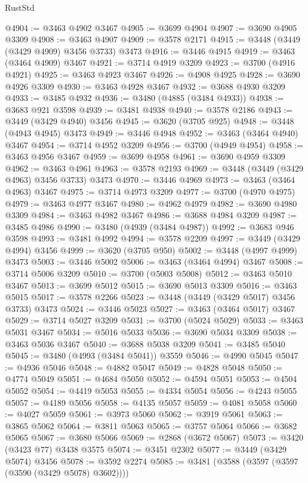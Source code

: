 \begin{lexlean}{RustStd}
\begin{coremodule}
{\begin{coremodule}
{{{{{{{{{{{{{{{{{{{{{{{{{{{{{{{{{{{{{{{{{{{{{{{{{{{{{{{{{{{{{{{{{{{{{{{{{{{{{{{{{{{{{@4904 := @3463 @4902 @3467
@4905 := @3699 @4904
@4907 := @3690 @4905 @3309
@4908 := @3463 @4907
@4909 := @3578 @2171
@4915 := @3448 (@3449 (@3429 @4909) @3456 @3733) @3473
@4916 := @3446 @4915
@4919 := @3463 (@3464 @4909) @3467
@4921 := @3714 @4919 @3209
@4923 := @3700 (@4916 @4921)
@4925 := @3463 @4923 @3467
@4926 := @4908 @4925
@4928 := @3690 @4926 @3309
@4930 := @3463 @4928 @3467
@4932 := @3688 @4930 @3209
@4933 := @3485 @4932
@4936 := @3480 (@4885 (@3484 @4933))
@4938 := @3683 @921 @3598
@4939 := @3481 @4938
@4940 := @3578 @2186
@4943 := @3449 (@3429 @4940) @3456
@4945 := @3620 (@3705 @925)
@4948 := @3448 (@4943 @4945) @3473
@4949 := @3446 @4948
@4952 := @3463 (@3464 @4940) @3467
@4954 := @3714 @4952 @3209
@4956 := @3700 (@4949 @4954)
@4958 := @3463 @4956 @3467
@4959 := @3699 @4958
@4961 := @3690 @4959 @3309
@4962 := @3463 @4961
@4963 := @3578 @2193
@4969 := @3448 (@3449 (@3429 @4963) @3456 @3733) @3473
@4970 := @3446 @4969
@4973 := @3463 (@3464 @4963) @3467
@4975 := @3714 @4973 @3209
@4977 := @3700 (@4970 @4975)
@4979 := @3463 @4977 @3467
@4980 := @4962 @4979
@4982 := @3690 @4980 @3309
@4984 := @3463 @4982 @3467
@4986 := @3688 @4984 @3209
@4987 := @3485 @4986
@4990 := @3480 (@4939 (@3484 @4987))
@4992 := @3683 @946 @3598
@4993 := @3481 @4992
@4994 := @3578 @2209
@4997 := @3449 (@3429 @4994) @3456
@4999 := @3620 (@3705 @950)
@5002 := @3448 (@4997 @4999) @3473
@5003 := @3446 @5002
@5006 := @3463 (@3464 @4994) @3467
@5008 := @3714 @5006 @3209
@5010 := @3700 (@5003 @5008)
@5012 := @3463 @5010 @3467
@5013 := @3699 @5012
@5015 := @3690 @5013 @3309
@5016 := @3463 @5015
@5017 := @3578 @2266
@5023 := @3448 (@3449 (@3429 @5017) @3456 @3733) @3473
@5024 := @3446 @5023
@5027 := @3463 (@3464 @5017) @3467
@5029 := @3714 @5027 @3209
@5031 := @3700 (@5024 @5029)
@5033 := @3463 @5031 @3467
@5034 := @5016 @5033
@5036 := @3690 @5034 @3309
@5038 := @3463 @5036 @3467
@5040 := @3688 @5038 @3209
@5041 := @3485 @5040
@5045 := @3480 (@4993 (@3484 @5041)) @3559
@5046 := @4990 @5045
@5047 := @4936 @5046
@5048 := @4882 @5047
@5049 := @4828 @5048
@5050 := @4774 @5049
@5051 := @4684 @5050
@5052 := @4594 @5051
@5053 := @4504 @5052
@5054 := @4419 @5053
@5055 := @4334 @5054
@5056 := @4243 @5055
@5057 := @4189 @5056
@5058 := @4135 @5057
@5059 := @4081 @5058
@5060 := @4027 @5059
@5061 := @3973 @5060
@5062 := @3919 @5061
@5063 := @3865 @5062
@5064 := @3811 @5063
@5065 := @3757 @5064
@5066 := @3682 @5065
@5067 := @3680 @5066
@5069 := @2868 (@3672 @5067)
@5073 := @3420 (@3423 @77) @3438 @3575
@5074 := @3451 @2302
@5077 := @3449 (@3429 @5074) @3456
@5078 := @3592 @2274
@5085 := @3481 (@3588 (@3597 (@3597 (@3590 (@3429 @5078) @3602))))
}}}}}}}}}}}}}}}}}}}}}}}}}}}}}}}}}}}}}}}}}}}}}}}}}}}}}}}}}}}}}}}}}}}}}}}}}}}}}}}}}}}}}
\end{coremodule}}
\end{coremodule}
\end{lexlean}
